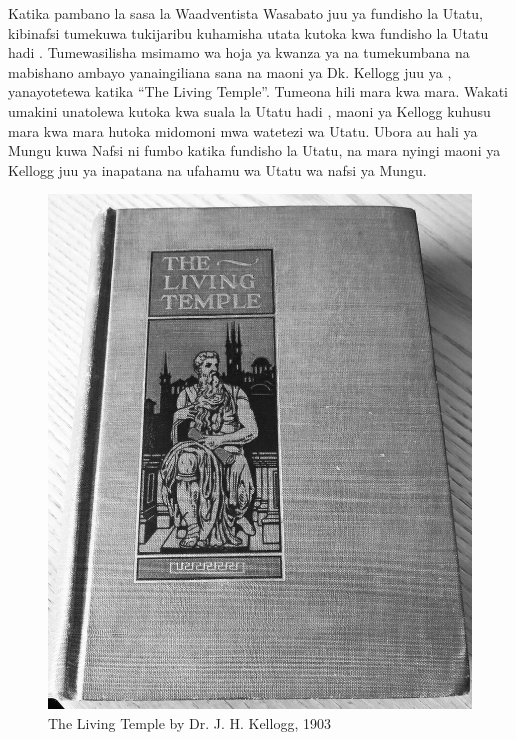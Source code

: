 Katika pambano la sasa la Waadventista Wasabato juu ya fundisho la Utatu, kibinafsi tumekuwa tukijaribu kuhamisha utata kutoka kwa fundisho la Utatu hadi . Tumewasilisha msimamo wa hoja ya kwanza ya  na tumekumbana na mabishano ambayo yanaingiliana sana na maoni ya Dk. Kellogg juu ya , yanayotetewa katika “The Living Temple”. Tumeona hili mara kwa mara. Wakati umakini unatolewa kutoka kwa suala la Utatu hadi , maoni ya Kellogg kuhusu  mara kwa mara hutoka midomoni mwa watetezi wa Utatu. Ubora au hali ya Mungu kuwa Nafsi ni fumbo katika fundisho la Utatu, na mara nyingi maoni ya Kellogg juu ya  inapatana na ufahamu wa Utatu wa nafsi ya Mungu.


\begin{figure}[hp]
    \centering
    \includegraphics[width=1\linewidth]{images/TLT.jpg}
    \caption*{The Living Temple by Dr. J. H. Kellogg, 1903}
    \label{fig:tlt}
\end{figure}


